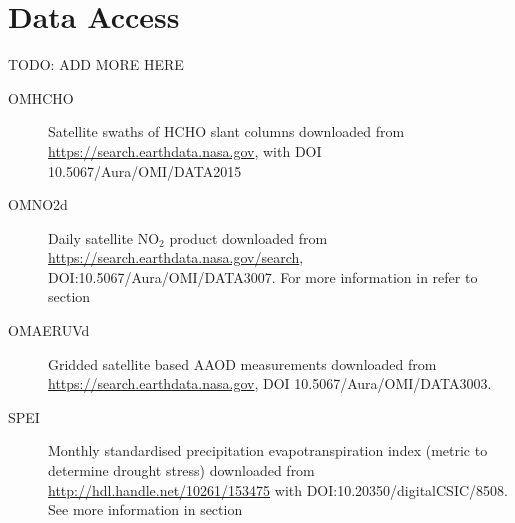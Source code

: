       
     
\section{Data Access}
TODO: ADD MORE HERE
\label{Model:DataAccess}
\begin{description}
  \item[OMHCHO] Satellite swaths of HCHO slant columns downloaded from \url{https://search.earthdata.nasa.gov}, with DOI 10.5067/Aura/OMI/DATA2015
  
  \item[OMNO2d] Daily satellite NO$_2$ product downloaded from \url{https://search.earthdata.nasa.gov/search}, DOI:10.5067/Aura/OMI/DATA3007. 
  For more information in refer to section %
  
  \item[OMAERUVd] Gridded satellite based AAOD measurements downloaded from \url{https://search.earthdata.nasa.gov}, DOI 10.5067/Aura/OMI/DATA3003. %
  
  \item[SPEI] Monthly standardised precipitation evapotranspiration index (metric to determine drought stress) downloaded from \url{http://hdl.handle.net/10261/153475} with DOI:10.20350/digitalCSIC/8508.
  See more information in section %
  
  
  
\end{description}